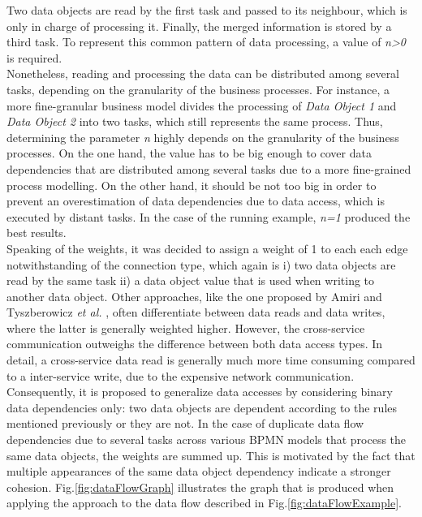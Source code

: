 \noindent
Two data objects are read by the first task and passed to its neighbour, which is only in charge of processing it. Finally, the merged information is stored by a third task. To represent this common pattern of data processing, a value of \textit{n>0} is required. \\
Nonetheless, reading and processing the data can be distributed among several tasks, depending on the granularity of the business processes. For instance, a more fine-granular business model divides the processing of \textit{Data Object 1} and \textit{Data Object 2} into two tasks, which still represents the same process.
Thus, determining the parameter \textit{n} highly depends on the granularity of the business processes. On the one hand, the value has to be big enough to cover data dependencies that are distributed among several tasks due to a more fine-grained process modelling. On the other hand, it should be not too big in order to prevent an overestimation of data dependencies due to data access, which is executed by distant tasks. In the case of the running example, \textit{n=1} produced the best results. \\
Speaking of the weights, it was decided to assign a weight of 1 to each each edge notwithstanding of the connection type, which again is i) two data objects are read by the same task ii) a data object value that is used when writing to another data object. Other approaches, like the one proposed by Amiri \cite{ObjectAwareAmiri} and Tyszberowicz \textit{et al.} \cite{FunctionalDecompositionHeinrich}, often differentiate between data reads and data writes, where the latter is generally weighted higher. However, the cross-service communication outweighs the difference between both data access types. In detail, a cross-service data read is generally much more time consuming compared to a inter-service write, due to the expensive network communication. Consequently, it is proposed to generalize data accesses by considering binary data dependencies only: two data objects are dependent according to the rules mentioned previously or they are not. 
In the case of duplicate data flow dependencies due to several tasks across various BPMN models that process the same data objects, the weights are summed up. This is motivated by the fact that multiple appearances of the same data object dependency indicate a stronger cohesion.
Fig.\ref{fig:dataFlowGraph} illustrates the graph that is produced when applying the approach to the data flow described in Fig.\ref{fig:dataFlowExample}.






